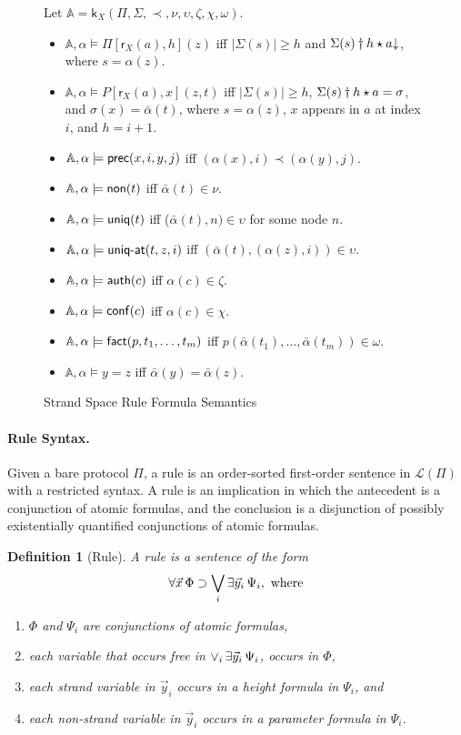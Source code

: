 \documentclass[12pt]{article}
\newcommand{\defd}{\mathord\downarrow}
\newcommand{\inst}{\star}
\newcommand{\lang}{\mathcal{L}}
\newcommand{\skel}{\mathbb{A}}
\newcommand{\skl}{\mathsf{k}}
\newcommand{\length}[1]{\ensuremath{|#1|}}
\newcommand{\role}{\mathsf{r}}
\newcommand{\ssp}{\Sigma}
\newtheorem{definition}{Definition}
\begin{document}
\begin{figure}
  Let $\skel=\skl_X(\Pi,\ssp,\prec,\nu,\upsilon,\zeta,\chi,\omega)$.
  \begin{itemize}
  \item $\skel,\alpha\models\Pi[\role_X(a),h](z)$ iff
    $\length{\ssp(s)}\geq h$ and
    $\prefix{\ssp(s)}{h}\inst a\defd$, where $s=\alpha(z)$.
  \item $\skel,\alpha\models P[\role_X(a),x](z,t)$ iff
    $\length{\ssp(s)}\geq h$,
    $\prefix{\ssp(s)}{h}\inst a=\sigma$, and
    $\sigma(x)=\bar\alpha(t)$,
    where $s=\alpha(z)$, $x$ appears in $a$ at index $i$, and $h=i+1$.
  \item $\skel,\alpha\models\cn{prec}(x,i,y,j)$ iff
    $(\alpha(x),i)\prec(\alpha(y),j)$.
  \item $\skel,\alpha\models\cn{non}(t)$ iff $\bar\alpha(t)\in\nu$.
  \item $\skel,\alpha\models\cn{uniq}(t)$ iff
    ($\bar\alpha(t),n)\in\upsilon$ for some node $n$.
  \item $\skel,\alpha\models\cn{uniq-at}(t,z,i)$ iff
    $(\bar\alpha(t),(\alpha(z),i))\in\upsilon$.
  \item $\skel,\alpha\models\cn{auth}(c)$ iff $\alpha(c)\in\zeta$.
  \item $\skel,\alpha\models\cn{conf}(c)$ iff $\alpha(c)\in\chi$.
  \item $\skel,\alpha\models\cn{fact}(p,t_1,\ldots,t_m)$ iff
    $p(\bar\alpha(t_1),\ldots,\bar\alpha(t_m))\in\omega$.
  \item $\skel,\alpha\models y=z$ iff $\bar\alpha(y)=\bar\alpha(z)$.
  \end{itemize}
  \caption{Strand Space Rule Formula Semantics}\label{fig:semantics}
\end{figure}

\paragraph{Rule Syntax.}

Given a bare protocol $\Pi$, a rule is an order-sorted first-order
sentence in $\lang(\Pi)$ with a restricted syntax.  A rule is an
implication in which the antecedent is a conjunction of atomic
formulas, and the conclusion is a disjunction of possibly
existentially quantified conjunctions of atomic formulas.

\begin{definition}[Rule]\label{def:rule}
  A \emph{rule} is a sentence of the form
  \[\mathop{\forall\vec{x}}\Phi\supset\bigvee_i\mathop{\exists\vec{y}_i}\Psi_i,\mbox{
    where}\]
  \begin{enumerate}
  \item $\Phi$ and $\Psi_i$ are conjunctions of atomic formulas,
  \item each variable that occurs free in $\vee_i\mathop{\exists\vec{y}_i}\Psi_i$,
    occurs in $\Phi$,
  \item each strand variable in $\vec{y}_i$ occurs in a height formula
    in $\Psi_i$, and
  \item each non-strand variable in $\vec{y}_i$ occurs in a parameter
    formula in $\Psi_i$.
  \end{enumerate}
\end{definition}
\end{document}
